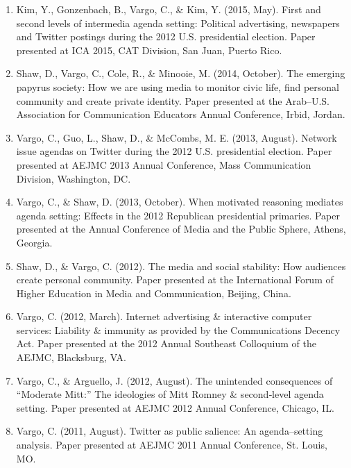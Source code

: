 \documentclass[11pt,letterpaper]{article}
\begin{document}
{\begin{enumerate}
\item Kim, Y., Gonzenbach, B., Vargo, C., \& Kim, Y. (2015, May). First and second levels of intermedia agenda setting: Political advertising, newspapers and Twitter postings during the 2012 U.S. presidential election. Paper presented at ICA 2015, CAT Division, San Juan, Puerto Rico.
\item Shaw, D., Vargo, C., Cole, R., \& Minooie, M. (2014, October). The emerging papyrus society: How we are using media to monitor civic life, find personal community and create private identity. Paper presented at the Arab--U.S. Association for Communication Educators Annual Conference, Irbid, Jordan.
\item Vargo, C., Guo, L., Shaw, D., \& McCombs, M. E. (2013, August). Network issue agendas on Twitter during the 2012 U.S. presidential election. Paper presented at AEJMC 2013 Annual Conference, Mass Communication Division, Washington, DC.
\item Vargo, C., \& Shaw, D. (2013, October). When motivated reasoning mediates agenda setting: Effects in the 2012 Republican presidential primaries. Paper presented at the Annual Conference of Media and the Public Sphere, Athens, Georgia.
\item Shaw, D., \& Vargo, C. (2012). The media and social stability: How audiences create personal community. Paper presented at the International Forum of Higher Education in Media and Communication, Beijing, China.
\item Vargo, C. (2012, March). Internet advertising \& interactive computer services: Liability \& immunity as provided by the Communications Decency Act. Paper presented at the 2012 Annual Southeast Colloquium of the AEJMC, Blacksburg, VA.
\item Vargo, C., \& Arguello, J. (2012, August). The unintended consequences of ``Moderate Mitt:'' The ideologies of Mitt Romney \& second‐level agenda setting. Paper presented at AEJMC 2012 Annual Conference, Chicago, IL.
\item Vargo, C. (2011, August). Twitter as public salience: An agenda--setting analysis. Paper presented at AEJMC 2011 Annual Conference, St. Louis, MO.
\end{enumerate}
}
\end{document}
